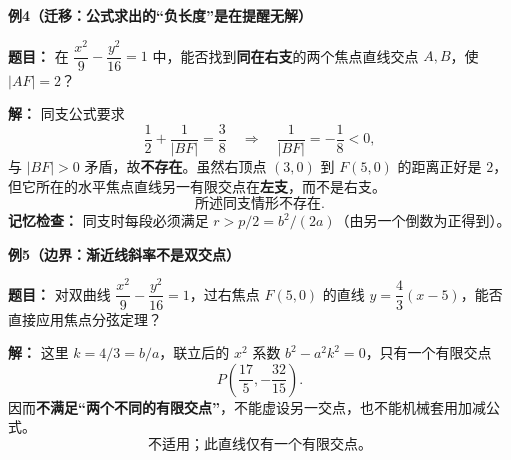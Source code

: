 \begin{examplebox}
  \medskip
  \textbf{\textcolor{CExample}{例4（迁移：公式求出的“负长度”是在提醒无解）}}

  \textbf{题目：} 在 $\dfrac{x^2}{9}-\dfrac{y^2}{16}=1$ 中，能否找到\textbf{同在右支}的两个焦点直线交点 $A,B$，使 $|AF|=2$？

  \textbf{解：} 同支公式要求
  \[
    \frac12+\frac1{|BF|}=\frac38
    \quad\Longrightarrow\quad
    \frac1{|BF|}=-\frac18<0,
  \]
  与 $|BF|>0$ 矛盾，故\textbf{不存在}。虽然右顶点 $(3,0)$ 到 $F(5,0)$ 的距离正好是 $2$，但它所在的水平焦点直线另一有限交点在\textbf{左支}，而不是右支。
  \[
    \boxed{\text{所述同支情形不存在}}.
  \]
  \textbf{记忆检查：} 同支时每段必须满足 $r>p/2=b^2/(2a)$（由另一个倒数为正得到）。

  \medskip
  \textbf{\textcolor{CExample}{例5（边界：渐近线斜率不是双交点）}}

  \textbf{题目：} 对双曲线 $\dfrac{x^2}{9}-\dfrac{y^2}{16}=1$，过右焦点 $F(5,0)$ 的直线 $y=\dfrac43(x-5)$，能否直接应用焦点分弦定理？

  \textbf{解：} 这里 $k=4/3=b/a$，联立后的 $x^2$ 系数 $b^2-a^2k^2=0$，只有一个有限交点
  \[
    P\left(\frac{17}{5},-\frac{32}{15}\right).
  \]
  因而\textbf{不满足“两个不同的有限交点”}，不能虚设另一交点，也不能机械套用加减公式。
  \[
    \boxed{\text{不适用；此直线仅有一个有限交点。}}
  \]
\end{examplebox}

